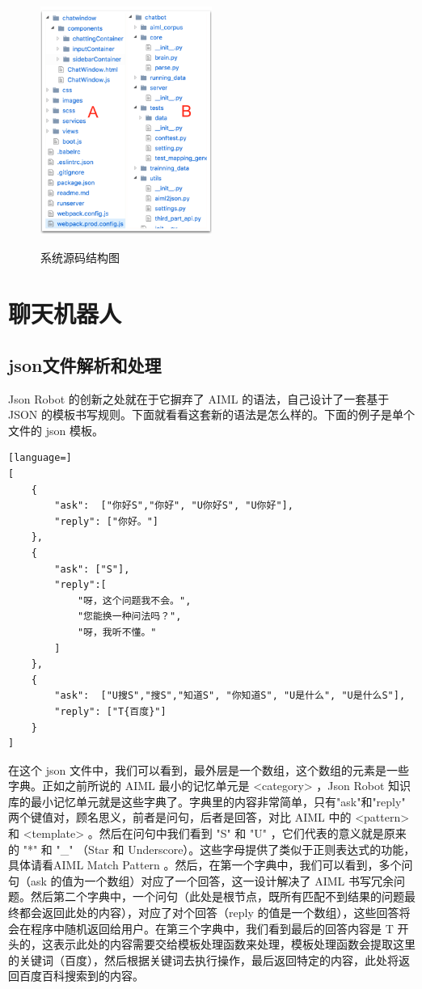 \documentclass[bachelor,winfonts]{jnuthesis}
\begin{document}
\begin{figure}[htbp]
  \centering
  \includegraphics[width= 0.5\textwidth]{source-code.png}\\
  \caption{系统源码结构图}\label{fig:pic4}
\end{figure}



\section{聊天机器人}
\subsection{json文件解析和处理}

Json Robot 的创新之处就在于它摒弃了 AIML 的语法，自己设计了一套基于 JSON 的模板书写规则。下面就看看这套新的语法是怎么样的。下面的例子是单个文件的 json 模板。

\begin{lstlisting}[language=]
[
    {
        "ask":  ["你好S","你好", "U你好S", "U你好"],
        "reply": ["你好。"]
    },
    {
        "ask": ["S"],
        "reply":[
            "呀，这个问题我不会。",
            "您能换一种问法吗？",
            "呀，我听不懂。"
        ]
    },
    {
        "ask":  ["U搜S","搜S","知道S", "你知道S", "U是什么", "U是什么S"],
        "reply": ["T{百度}"]
    }
]
\end{lstlisting}

在这个 json 文件中，我们可以看到，最外层是一个数组，这个数组的元素是一些字典。正如之前所说的 AIML 最小的记忆单元是 <category> ，Json Robot 知识库的最小记忆单元就是这些字典了。字典里的内容非常简单，只有"ask"和"reply" 两个键值对，顾名思义，前者是问句，后者是回答，对比 AIML 中的 <pattern> 和 <template> 。然后在问句中我们看到 "S" 和 "U" ，它们代表的意义就是原来的 "*" 和 "\_" （Star 和 Underscore）。这些字母提供了类似于正则表达式的功能，具体请看AIML Match Pattern \cite{aiml-match-pattern}。然后，在第一个字典中，我们可以看到，多个问句（ask 的值为一个数组）对应了一个回答，这一设计解决了 AIML 书写冗余问题。然后第二个字典中，一个问句（此处是根节点，既所有匹配不到结果的问题最终都会返回此处的内容），对应了对个回答（reply 的值是一个数组），这些回答将会在程序中随机返回给用户。在第三个字典中，我们看到最后的回答内容是 T 开头的，这表示此处的内容需要交给模板处理函数来处理，模板处理函数会提取这里的关键词（百度），然后根据关键词去执行操作，最后返回特定的内容，此处将返回百度百科搜索到的内容。
\end{document}
